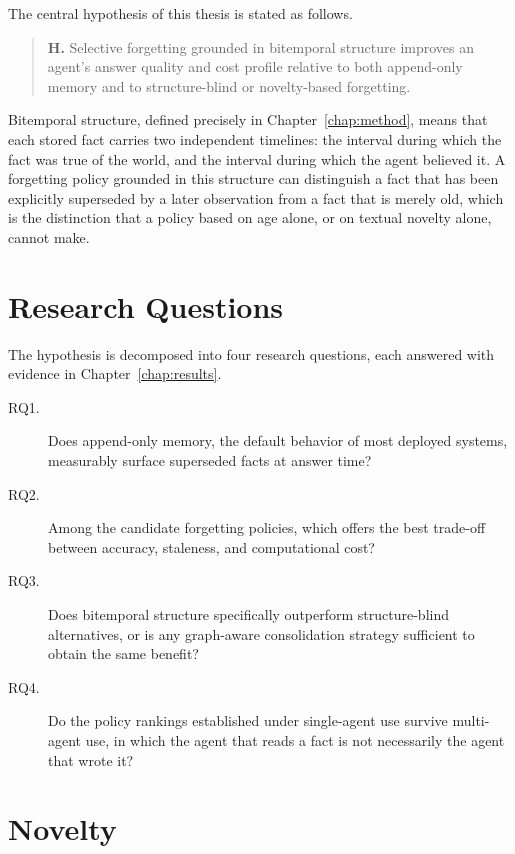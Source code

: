The central hypothesis of this thesis is stated as follows.

\begin{quote}
\textbf{H.} Selective forgetting grounded in bitemporal structure improves an agent's answer quality and cost profile relative to both append-only memory and to structure-blind or novelty-based forgetting.
\end{quote}

Bitemporal structure, defined precisely in Chapter~\ref{chap:method}, means that each stored fact carries two independent timelines: the interval during which the fact was true of the world, and the interval during which the agent believed it. A forgetting policy grounded in this structure can distinguish a fact that has been explicitly superseded by a later observation from a fact that is merely old, which is the distinction that a policy based on age alone, or on textual novelty alone, cannot make.

\section{Research Questions}
\label{sec:research-questions}

The hypothesis is decomposed into four research questions, each answered with evidence in Chapter~\ref{chap:results}.

\begin{description}
\item[RQ1.] Does append-only memory, the default behavior of most deployed systems, measurably surface superseded facts at answer time?
\item[RQ2.] Among the candidate forgetting policies, which offers the best trade-off between accuracy, staleness, and computational cost?
\item[RQ3.] Does bitemporal structure specifically outperform structure-blind alternatives, or is any graph-aware consolidation strategy sufficient to obtain the same benefit?
\item[RQ4.] Do the policy rankings established under single-agent use survive multi-agent use, in which the agent that reads a fact is not necessarily the agent that wrote it?
\end{description}

\section{Novelty}
\label{sec:novelty}


